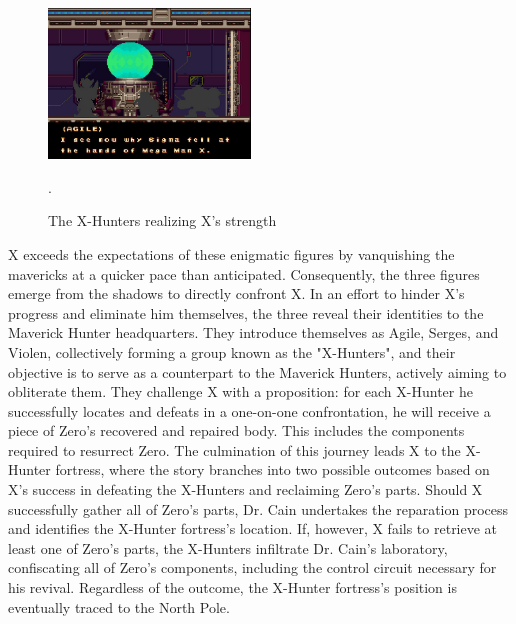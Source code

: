 \begin{figure}[htp]
	\centering
	\includegraphics[height=4cm]{figures/X2/story_2.jpg}
	\caption {The X-Hunters realizing X's strength}.
\end{figure}

X exceeds the expectations of these enigmatic figures by vanquishing the mavericks at a quicker pace than anticipated. Consequently, the three figures emerge from the shadows to directly confront X. In an effort to hinder X's progress and eliminate him themselves, the three reveal their identities to the Maverick Hunter headquarters. They introduce themselves as Agile, Serges, and Violen, collectively forming a group known as the "X-Hunters", and their objective is to serve as a counterpart to the Maverick Hunters, actively aiming to obliterate them. They challenge X with a proposition: for each X-Hunter he successfully locates and defeats in a one-on-one confrontation, he will receive a piece of Zero's recovered and repaired body. This includes the components required to resurrect Zero. The culmination of this journey leads X to the X-Hunter fortress, where the story branches into two possible outcomes based on X's success in defeating the X-Hunters and reclaiming Zero's parts. Should X successfully gather all of Zero's parts, Dr. Cain undertakes the reparation process and identifies the X-Hunter fortress's location. If, however, X fails to retrieve at least one of Zero's parts, the X-Hunters infiltrate Dr. Cain's laboratory, confiscating all of Zero's components, including the control circuit necessary for his revival. Regardless of the outcome, the X-Hunter fortress's position is eventually traced to the North Pole.

